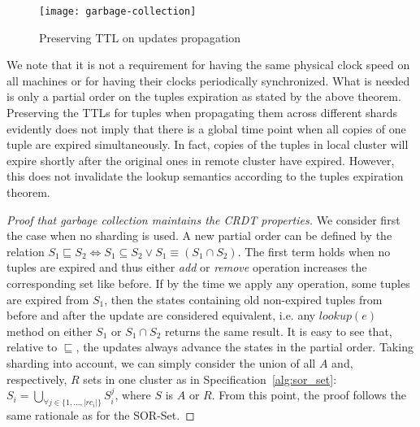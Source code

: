 \begin{figure}[b]
  \centering
  \texttt{[image: garbage-collection]}
  \caption{Preserving TTL on updates propagation}
  \label{fig:garbage-collection}
\end{figure}

We note that it is not a requirement for having the same physical clock speed on
all machines or for having their clocks periodically synchronized. What is
needed is only a partial order on the tuples expiration as stated by the above
theorem. Preserving the TTLs for tuples when propagating them across different
shards evidently does not imply that there is a global time point when all
copies of one tuple are expired simultaneously. In fact, copies of the tuples in
local cluster will expire shortly after the original ones in remote cluster have
expired. However, this does not invalidate the lookup semantics according to the
tuples expiration theorem.

\begin{proof}[Proof that garbage collection maintains the CRDT properties]
We consider first the case when no sharding is used. A new partial order can be
defined by the relation $S_{1} \sqsubseteq S_{2} \iff S_{1} \subseteq S_{2} \lor
S_{1} \equiv (S_{1} \cap S_{2})$. The first term holds when no tuples are
expired and thus either \textit{add} or \textit{remove} operation increases the
corresponding set like before. If by the time we apply any operation, some
tuples are expired from $S_{1}$, then the states containing old non-expired
tuples from before and after the update are considered equivalent, i.e. any
$\textit{lookup}(e)$ method on either $S_{1}$ or $S_{1} \cap S_{2}$ returns the
same result. It is easy to see that, relative to $\sqsubseteq$, the updates
always advance the states in the partial order. Taking sharding into account, we
can simply consider the union of all $A$ and, respectively, $R$ sets in one
cluster as in Specification~\ref{alg:sor_set}: $S_{i} = \bigcup_{\forall j \in
\{1,\ldots,|rc_{i}|\}} S_{i}^{j}$, where $S$ is $A$ or $R$. From this point, the
proof follows the same rationale as for the SOR-Set.
\end{proof}